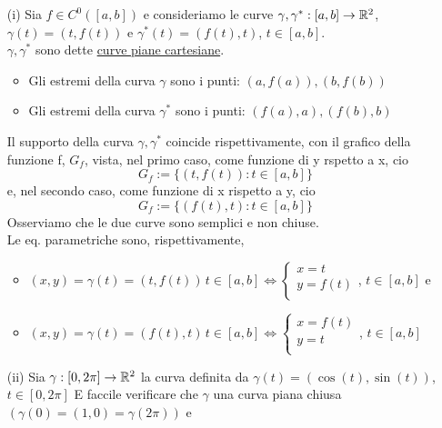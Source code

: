 \begin{example}
  \begin{itemize}
    \item[(i)] Sia $f\in C^0([a,b])$ e consideriamo le curve $\gamma, \gamma^* : [a,b]\to \mathbb{R}^2$,
              $\gamma(t) = (t,f(t))$ e $\gamma^*(t) = (f(t),t)$, $t \in [a,b]$.\\
              $\gamma, \gamma^*$ sono dette \underline{curve piane cartesiane}.
              \begin{itemize}
                \item Gli estremi della curva $\gamma$ sono i punti: $(a,f(a)), (b,f(b))$
                \item Gli estremi della curva $\gamma^*$ sono i punti: $(f(a),a), (f(b),b)$
              \end{itemize}
              Il supporto della curva $\gamma,\gamma^*$ coincide rispettivamente, con il grafico della funzione
              f, $G_f$, vista, nel primo caso, come funzione di y rspetto a x, cio\ace 
              $$G_f := \{(t,f(t)):t\in[a,b]\}$$
              e, nel secondo caso, come funzione di x rispetto a y, cio\ace $$G_f :=\{(f(t),t):t\in[a,b]\}$$
              Osserviamo che le due curve sono semplici e non chiuse. \\
              Le eq. parametriche sono, rispettivamente, 
              \begin{itemize}
                \item $(x,y) = \gamma(t) = (t,f(t)) \, t \in [a,b] \iff \left\{\begin{array}{l}
                  x = t \\
                  y = f(t) \\
                \end{array}\right.$, $t \in [a,b]$ e 
                \item $(x,y) = \gamma(t) = (f(t),t) \, t \in [a,b] \iff \left\{\begin{array}{l}
                  x = f(t)\\
                  y = t \\
                \end{array}\right.$, $t \in [a,b]$
              \end{itemize}
    \item[(ii)] Sia $\gamma:[0,2\pi] \to \mathbb{R}^2$ la curva definita da $\gamma(t) = (\cos(t),\sin(t))$, $t \in [0,2\pi]$
                \ac{E} faccile verificare che $\gamma$ \ace una curva piana chiusa $(\gamma(0) = (1,0) = \gamma(2\pi))$ e 

\end{itemize}
\end{example}
